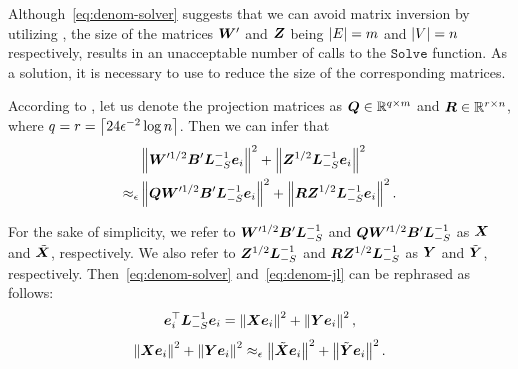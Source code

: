 \documentclass[journal]{IEEEtran}
\begin{document}
Although~\eqref{eq:denom-solver} suggests that we can avoid matrix inversion by utilizing , the size of the matrices \(\boldsymbol{W}'\) and \(\boldsymbol{Z}\) being \(\left|E \right|=m\) and \(\left|V \right|=n\) respectively, results in an unacceptable number of calls to the \(\mathtt{Solve}\) function.
As a solution, it is necessary to use  to reduce the size of the corresponding matrices.

According to , let us denote the projection matrices as \(\boldsymbol{Q}\in\mathbb{R}^{q\times m}\) and \(\boldsymbol{R}\in\mathbb{R}^{r\times n}\), where \(q=r=\left\lceil24\epsilon^{-2}\log n\right\rceil\).
Then we can infer that
\begin{equation}\label{eq:denom-jl}
    \begin{split}
        &\left\Vert\boldsymbol{W}'^{1/2}\boldsymbol{B}'\boldsymbol{L}_{-S}^{-1}\boldsymbol{e}_i\right\Vert^2+\left\Vert\boldsymbol{Z}^{1/2}\boldsymbol{L}_{-S}^{-1}\boldsymbol{e}_i\right\Vert^2\\
        \approx_\epsilon&\left\Vert\boldsymbol{Q}\boldsymbol{W}'^{1/2}\boldsymbol{B}'\boldsymbol{L}_{-S}^{-1}\boldsymbol{e}_i\right\Vert^2+\left\Vert\boldsymbol{R}\boldsymbol{Z}^{1/2}\boldsymbol{L}_{-S}^{-1}\boldsymbol{e}_i\right\Vert^2.
    \end{split}
\end{equation}

For the sake of simplicity, we refer to \(\boldsymbol{W}'^{1/2}\boldsymbol{B}'\boldsymbol{L}_{-S}^{-1}\) and \(\boldsymbol{Q}\boldsymbol{W}'^{1/2}\boldsymbol{B}'\boldsymbol{L}_{-S}^{-1}\) as \(\boldsymbol{X}\) and \(\tilde{\boldsymbol{X}}\), respectively.
We also refer to \(\boldsymbol{Z}^{1/2}\boldsymbol{L}_{-S}^{-1}\) and \(\boldsymbol{R}\boldsymbol{Z}^{1/2}\boldsymbol{L}_{-S}^{-1}\) as \(\boldsymbol{Y}\) and \(\tilde{\boldsymbol{Y}}\), respectively.
Then~\eqref{eq:denom-solver} and~\eqref{eq:denom-jl} can be rephrased as follows:
\begin{equation}\label{eq:denom-solver-simp}
    \boldsymbol{e}_i^\top\boldsymbol{L}_{-S}^{-1}\boldsymbol{e}_i=\left\Vert\boldsymbol{X}\boldsymbol{e}_i\right\Vert^2+\left\Vert\boldsymbol{Y}\boldsymbol{e}_i\right\Vert^2,
\end{equation}
\begin{equation}\label{eq:denom-jl-simp}
    \left\Vert\boldsymbol{X}\boldsymbol{e}_i\right\Vert^2+\left\Vert\boldsymbol{Y}\boldsymbol{e}_i\right\Vert^2\approx_\epsilon\left\Vert\tilde{\boldsymbol{X}}\boldsymbol{e}_i\right\Vert^2+\left\Vert\tilde{\boldsymbol{Y}}\boldsymbol{e}_i\right\Vert^2.
\end{equation}
\end{document}
